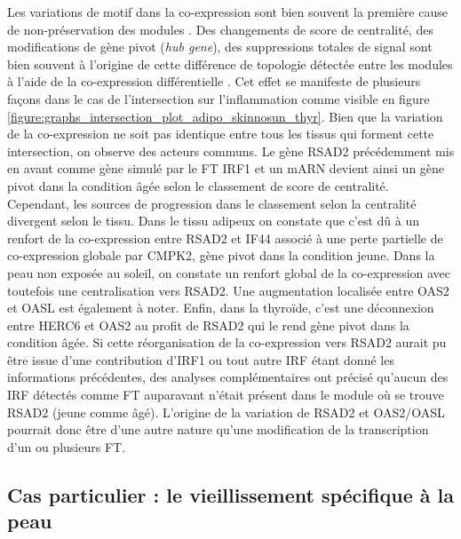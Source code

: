 Les variations de motif dans la co-expression sont bien souvent la première cause de non-préservation des modules . Des changements de score de centralité, des modifications de gène pivot (\textit{hub gene}), des suppressions totales de signal sont bien souvent à l'origine de cette différence de topologie détectée entre les modules à l'aide de la co-expression différentielle . Cet effet se manifeste de plusieurs façons dans le cas de l'intersection sur l'inflammation comme visible en figure \ref{figure:graphs_intersection_plot_adipo_skinnosun_thyr}. Bien que la variation de la co-expression ne soit pas identique entre tous les tissus qui forment cette intersection, on observe des acteurs communs. Le gène RSAD2 précédemment mis en avant comme gène simulé par le FT IRF1 et un mARN devient ainsi un gène pivot dans la condition âgée selon le classement de score de centralité. Cependant, les sources de progression dans le classement selon la centralité divergent selon le tissu. Dans le tissu adipeux on constate que c'est dû à un renfort de la co-expression entre RSAD2 et IF44 associé à une perte partielle de co-expression globale par CMPK2, gène pivot dans la condition jeune. Dans la peau non exposée au soleil, on constate un renfort global de la co-expression avec toutefois une centralisation vers RSAD2. Une augmentation localisée entre OAS2 et OASL est également à noter. Enfin, dans la thyroïde, c'est une déconnexion entre HERC6 et OAS2 au profit de RSAD2 qui le rend gène pivot dans la condition âgée. Si cette réorganisation de la co-expression vers RSAD2 aurait pu être issue d'une contribution d'IRF1 ou tout autre IRF étant donné les informations précédentes, des analyses complémentaires ont précisé qu'aucun des IRF détectés comme FT auparavant n'était présent dans le module où se trouve RSAD2 (jeune comme âgé). L'origine de la variation de RSAD2 et OAS2/OASL pourrait donc être d'une autre nature qu'une modification de la transcription d'un ou plusieurs FT.


\subsection{Cas particulier : le vieillissement spécifique à la peau}

